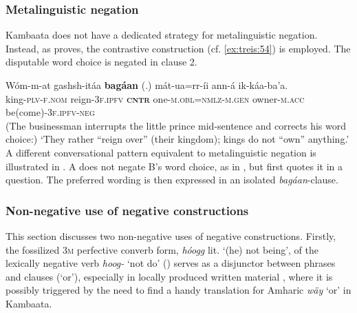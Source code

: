 \documentclass[output=paper,colorlinks,citecolor=brown,draftmode
]{langscibook}
\begin{document}
\subsubsection{Metalinguistic negation}\label{sec:treis:4.6.2}

Kambaata does not have a dedicated strategy for metalinguistic negation. Instead, as  proves, the contrastive construction (cf. \ref{ex:treis:54}) is employed. The disputable word choice is negated in clause 2. 

\ea\label{ex:treis:58} 
\gll Wóm-m-at gashsh-itáa \textbf{bagáan} (.) mát-ua=rr-íi ann-á ik-káa-ba'a.	\\
	king-\textsc{plv-f.nom} reign-\textsc{3f.ipfv} \textbf{\textsc{cntr}} {} one-\textsc{m.obl}=\textsc{nmlz-m.gen} owner-\textsc{m.acc} be(come)-\textsc{3f.ipfv-neg}\\
\glt (The businessman interrupts the little prince mid-sentence and corrects his word choice:) ‘They rather “reign over” (their kingdom); kings do not “own” anything.’ \citep[47]{Saint-Exupéry2018}
\z 
A different conversational pattern equivalent to metalinguistic negation is illustrated in . A does not negate B's word choice, as in , but first quotes it in a question. The preferred wording is then expressed in an isolated \textit{bagáan}-clause.



\subsubsection{Non-negative use of negative constructions}\label{sec:treis:4.6.3}
\largerpage
This section discusses two non-negative uses of negative constructions. Firstly, the fossilized \textsc{3m} perfective converb form, \textit{hóogg} lit. ‘(he) not being’, of the lexically negative verb \textit{hoog-} ‘not do' () serves as a disjunctor between phrases and clauses (‘or’), especially in locally produced written material , where it is possibly triggered by the need to find a handy translation for Amharic \textit{wäy} ‘or’ in Kambaata.
\end{document}
